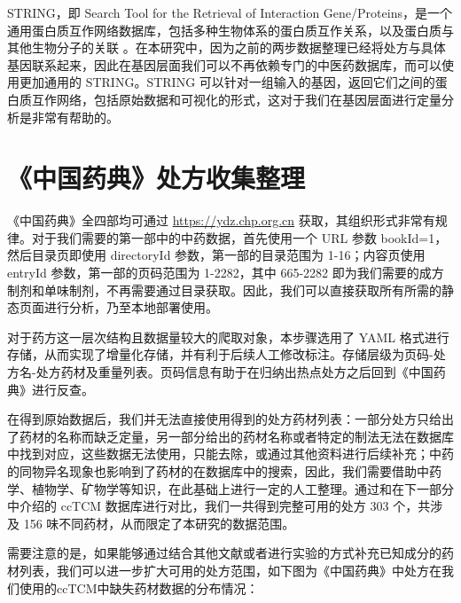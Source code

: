 STRING，即 Search Tool for the Retrieval of Interaction Gene/Proteins，是一个通用蛋白质互作网络数据库，包括多种生物体系的蛋白质互作关系，以及蛋白质与其他生物分子的关联\cite{Szklarczyk_Gable_Nastou_Lyon_Kirsch_Pyysalo_Doncheva_Legeay_Fang_Bork_et_al._2021} 。在本研究中，因为之前的两步数据整理已经将处方与具体基因联系起来，因此在基因层面我们可以不再依赖专门的中医药数据库，而可以使用更加通用的 STRING。STRING 可以针对一组输入的基因，返回它们之间的蛋白质互作网络，包括原始数据和可视化的形式，这对于我们在基因层面进行定量分析是非常有帮助的。

\section{《中国药典》处方收集整理}

《中国药典》全四部均可通过 \url{https://ydz.chp.org.cn} 获取，其组织形式非常有规律\cite{中华人民共和国药典_2023}。对于我们需要的第一部中的中药数据，首先使用一个 URL 参数 {bookId=1}，然后目录页即使用 {directoryId} 参数，第一部的目录范围为 1-16；内容页使用 {entryId} 参数，第一部的页码范围为 1-2282，其中 665-2282 即为我们需要的成方制剂和单味制剂，不再需要通过目录获取。因此，我们可以直接获取所有所需的静态页面进行分析，乃至本地部署使用。

对于药方这一层次结构且数据量较大的爬取对象，本步骤选用了 YAML 格式进行存储，从而实现了增量化存储，并有利于后续人工修改标注。存储层级为页码-处方名-处方药材及重量列表。页码信息有助于在归纳出热点处方之后回到《中国药典》进行反查。

在得到原始数据后，我们并无法直接使用得到的处方药材列表：一部分处方只给出了药材的名称而缺乏定量，另一部分给出的药材名称或者特定的制法无法在数据库中找到对应，这些数据无法使用，只能去除，或通过其他资料进行后续补充；中药的同物异名现象也影响到了药材的在数据库中的搜索，因此，我们需要借助中药学、植物学、矿物学等知识，在此基础上进行一定的人工整理。通过和在下一部分中介绍的 ccTCM 数据库进行对比，我们一共得到完整可用的处方 303 个，共涉及 156 味不同药材，从而限定了本研究的数据范围。

需要注意的是，如果能够通过结合其他文献或者进行实验的方式补充已知成分的药材列表，我们可以进一步扩大可用的处方范围，如下图为《中国药典》中处方在我们使用的ccTCM中缺失药材数据的分布情况：


